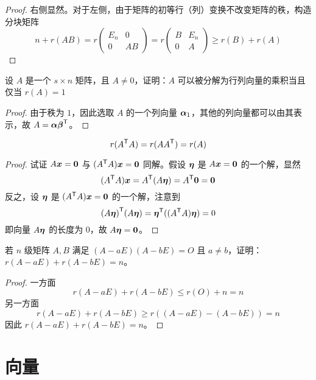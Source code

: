 \begin{proof}
	右侧显然。对于左侧，由于矩阵的初等行（列）变换不改变矩阵的秩，构造分块矩阵
	\[ n + r(AB) = r \left(\begin{matrix}
				E_n & 0 \\ 0 & AB
			\end{matrix}\right) = r\left(\begin{matrix}
				B & E_n \\ 0 & A
			\end{matrix}\right) \geqslant r(B) + r(A) \]
\end{proof}

\begin{theorem}
	设 $A$ 是一个 $s \times n$ 矩阵，且 $A \neq 0$，证明：$A$ 可以被分解为行列向量的乘积当且仅当 $r(A) = 1$
\end{theorem}

\begin{proof}
	由于秩为 $1$，因此选取 $A$ 的一个列向量 $\boldsymbol{\alpha}_1$，其他的列向量都可以由其表示，故 $A = \boldsymbol{\alpha} {\boldsymbol{\beta}}^\mathsf{T}$。
\end{proof}

\begin{theorem}
	\[ r({A}^\mathsf{T}A) = r(A {A}^\mathsf{T}) = r(A) \]
\end{theorem}

\begin{proof}
	试证 $A\boldsymbol{x} = \boldsymbol{0}$ 与 $({A}^\mathsf{T}A) \boldsymbol{x} = \boldsymbol{0}$ 同解。假设 $\boldsymbol{\eta}$ 是 $A \boldsymbol{x} = \boldsymbol{0}$ 的一个解，显然
	\[ ({A}^\mathsf{T}A) \boldsymbol{x} = {A}^\mathsf{T} (A \boldsymbol{\eta}) = {A}^\mathsf{T} \boldsymbol{0} = \boldsymbol{0} \]
	反之，设 $\boldsymbol{\eta}$ 是 $({A}^\mathsf{T}A) \boldsymbol{x} = \boldsymbol{0}$ 的一个解，注意到
	\[ {(A \boldsymbol{\eta})}^\mathsf{T}(A \boldsymbol{\eta}) = {\boldsymbol{\eta}}^\mathsf{T} (({A}^\mathsf{T}A) \boldsymbol{\eta}) = 0 \]
	即向量 $A \boldsymbol{\eta}$ 的长度为 $0$，故 $A \boldsymbol{\eta} = \boldsymbol{0}$。
\end{proof}

\begin{theorem}
	若 $n$ 级矩阵 $A,B$ 满足 $(A - aE)(A - bE) = O$ 且 $a \neq b$，证明：$r(A - aE) + r(A - bE) = n$。
\end{theorem}

\begin{proof}
	一方面
	\[ r(A - aE) + r(A - bE) \leqslant r(O) + n = n \]
	另一方面
	\[ r(A - aE) + r(A - bE) \geqslant r((A - aE) - (A - bE)) = n \]
	因此 $r(A - aE) + r(A - bE) = n$。
\end{proof}

\section{向量}

